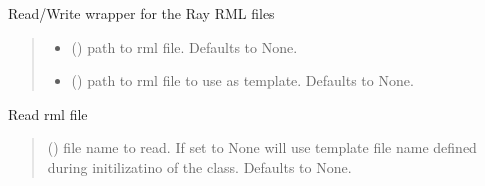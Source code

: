 \documentclass[letterpaper,10pt,english]{sphinxmanual}
\begin{document}
\begin{fulllineitems}
\label{\detokenize{code_documentation:raypyng.rml.RMLFile}}
\pysigstartsignatures
{}
\pysigstopsignatures
\sphinxAtStartPar
Read/Write wrapper for the Ray RML files
\begin{quote}\begin{description}
\begin{itemize}
\item {} 
\sphinxAtStartPar
{} (\sphinxstyleliteralemphasis{\sphinxupquote{, }}) \textendash{} path to rml file. Defaults to None.

\item {} 
\sphinxAtStartPar
{} (\sphinxstyleliteralemphasis{\sphinxupquote{, }}) \textendash{} path to rml file to use as template.
Defaults to None.

\end{itemize}

\end{description}\end{quote}

\begin{fulllineitems}
\label{\detokenize{code_documentation:raypyng.rml.RMLFile.read}}
\pysigstartsignatures
{}
\pysigstopsignatures
\sphinxAtStartPar
Read rml file
\begin{quote}\begin{description}
\sphinxAtStartPar
{} (\sphinxstyleliteralemphasis{\sphinxupquote{, }}) \textendash{} file name to read. If set to None will use template file name defined during initilizatino of the class. Defaults to None.


\end{description}
\end{quote}
\end{fulllineitems}
\end{fulllineitems}
\end{document}
